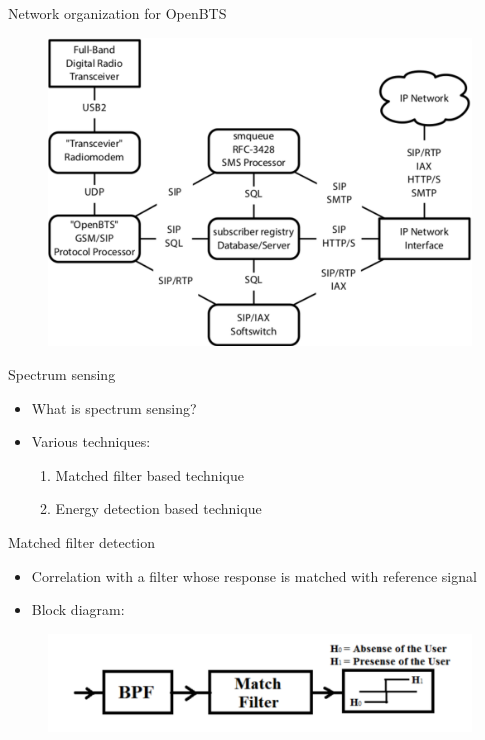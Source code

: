 \documentclass{beamer}
\begin{document}
  \begin{frame}{Network organization for OpenBTS}
    \begin{figure}
      \centering
      \includegraphics[width=0.97\linewidth]{img/btsSimple}
    \end{figure}
  \end{frame}
  
  \begin{frame}{Spectrum sensing}
    \begin{itemize}
      \item What is spectrum sensing?
      \item Various techniques:
      \begin{enumerate}
        \item Matched filter based technique
        \item Energy detection based technique
      \end{enumerate}
    \end{itemize}
  \end{frame}

  \begin{frame}{Matched filter detection}
    \begin{itemize}
      \item Correlation with a filter whose response is matched with reference signal
      \item Block diagram:
    \end{itemize}
    \begin{figure}
      \centering
      \includegraphics[width=0.97\linewidth]{img/matchedFilter}
    \end{figure}
  \end{frame}
\end{document}
